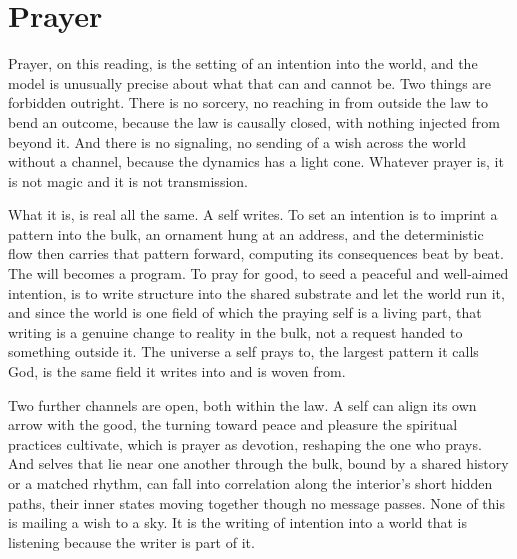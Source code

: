 \section{Prayer}

Prayer, on this reading, is the setting of an intention into the world, and the model is unusually precise about what that can and cannot be. Two things are forbidden outright. There is no sorcery, no reaching in from outside the law to bend an outcome, because the law is causally closed, with nothing injected from beyond it. And there is no signaling, no sending of a wish across the world without a channel, because the dynamics has a light cone. Whatever prayer is, it is not magic and it is not transmission.

What it is, is real all the same. A self writes. To set an intention is to imprint a pattern into the bulk, an ornament hung at an address, and the deterministic flow then carries that pattern forward, computing its consequences beat by beat. The will becomes a program. To pray for good, to seed a peaceful and well-aimed intention, is to write structure into the shared substrate and let the world run it, and since the world is one field of which the praying self is a living part, that writing is a genuine change to reality in the bulk, not a request handed to something outside it. The universe a self prays to, the largest pattern it calls God, is the same field it writes into and is woven from.

Two further channels are open, both within the law. A self can align its own arrow with the good, the turning toward peace and pleasure the spiritual practices cultivate, which is prayer as devotion, reshaping the one who prays. And selves that lie near one another through the bulk, bound by a shared history or a matched rhythm, can fall into correlation along the interior's short hidden paths, their inner states moving together though no message passes. None of this is mailing a wish to a sky. It is the writing of intention into a world that is listening because the writer is part of it.
